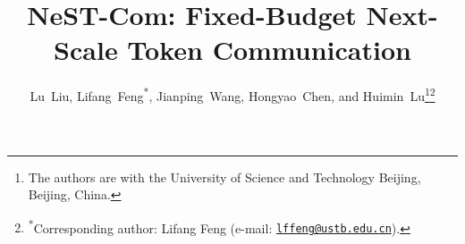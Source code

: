 \documentclass[10pt,journal,letterpaper]{IEEEtran}
\begin{document}
\title{NeST-Com: Fixed-Budget Next-Scale Token Communication}
\author{Lu~Liu, Lifang~Feng\textsuperscript{*}, Jianping~Wang, Hongyao~Chen, and Huimin~Lu\thanks{The authors are with the University of Science and Technology Beijing, Beijing, China.}\thanks{\textsuperscript{*}Corresponding author: Lifang Feng (e-mail: \href{mailto:lffeng@ustb.edu.cn}{\nolinkurl{lffeng@ustb.edu.cn}}).}}
\maketitle






\end{document}
